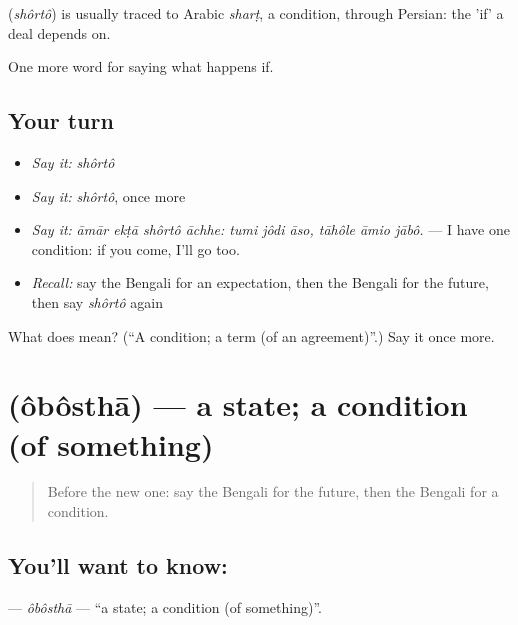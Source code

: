 \begin{cousinweb}
\textbf{} (\emph{shôrtô}) is usually traced to Arabic \emph{sharṭ}, a condition, through Persian: the 'if' a deal depends on.
\end{cousinweb}

\begin{grammarlens}[title={What you've built}]
One more word for saying what happens if.
\end{grammarlens}

\subsection*{Your turn}
\begin{itemize}
\raggedright
  \item \emph{Say it:} \emph{shôrtô}
  \item \emph{Say it:} \emph{shôrtô}, once more
  \item \emph{Say it:} \emph{āmār ekṭā shôrtô āchhe: tumi jôdi āso, tāhôle āmio jābô.} — I have one condition: if you come, I'll go too.
  \item \emph{Recall:} say the Bengali for an expectation, then the Bengali for the future, then say \emph{shôrtô} again
\end{itemize}

\begin{tcolorbox}[breakable,colback=teal!4,colframe=teal!35!black,title={Before you move on}]
What does  mean? (\textquotedblleft{}A condition; a term (of an agreement)\textquotedblright{}.) Say it once more.
\end{tcolorbox}
\section[\texorpdfstring{\bn{অবস্থা} (ôbôsthā)}{অবস্থা (ôbôsthā)}]{ (ôbôsthā) — a state; a condition (of something)}

\label{lesson:BN-C368-obostha}



\begin{quote}
Before the new one: say the Bengali for the future, then the Bengali for a condition.
\end{quote}

\subsection*{You'll want to know: }
\textbf{} — \emph{ôbôsthā} — \textquotedblleft{}a state; a condition (of something)\textquotedblright{}.

